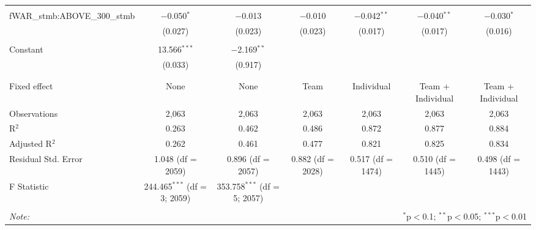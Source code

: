 \begin{table}[!htbp]
\begin{tabular}{@{\extracolsep{5pt}}lcccccc}
  & & & & & & \\
 fWAR\_stmb:ABOVE\_300\_stmb & $-$0.050$^{*}$ & $-$0.013 & $-$0.010 & $-$0.042$^{**}$ & $-$0.040$^{**}$ & $-$0.030$^{*}$ \\
  & (0.027) & (0.023) & (0.023) & (0.017) & (0.017) & (0.016) \\
  & & & & & & \\
 Constant & 13.566$^{***}$ & $-$2.169$^{**}$ &  &  &  &  \\
  & (0.033) & (0.917) &  &  &  &  \\
  & & & & & & \\
\hline \\[-1.8ex]
Fixed effect & None & None & Team & Individual & Team + Individual & Team + Individual \\
Observations & 2,063 & 2,063 & 2,063 & 2,063 & 2,063 & 2,063 \\
R$^{2}$ & 0.263 & 0.462 & 0.486 & 0.872 & 0.877 & 0.884 \\
Adjusted R$^{2}$ & 0.262 & 0.461 & 0.477 & 0.821 & 0.825 & 0.834 \\
Residual Std. Error & 1.048 (df = 2059) & 0.896 (df = 2057) & 0.882 (df = 2028) & 0.517 (df = 1474) & 0.510 (df = 1445) & 0.498 (df = 1443) \\
F Statistic & 244.465$^{***}$ (df = 3; 2059) & 353.758$^{***}$ (df = 5; 2057) &  &  &  &  \\
\hline
\hline \\[-1.8ex]
\textit{Note:}  & \multicolumn{6}{r}{$^{*}$p$<$0.1; $^{**}$p$<$0.05; $^{***}$p$<$0.01} \\
\end{tabular}
\end{table}
